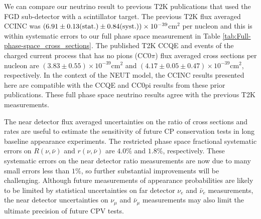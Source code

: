 
We can compare our neutrino result to previous 
T2K publications that used the FGD sub-detector with a scintillator target.
The previous T2K flux averaged
CCINC \citep{t2k-carbon-ccinc} was 
 $(6.91\pm0.13{\rm (stat.)}\pm0.84{\rm (syst.)}) \times 10^{-39}$cm$^2$  per nucleon
and this is within systematic errors to our full phase space measurement
in Table \ref{tab:Full-phase-space_cross_sections}.
The published T2K CCQE \citep{t2k-cceq} and 
events of the charged current process that has no pions (CC0$\pi$) \citep{cc0pi}
flux averaged cross sections per nucleon are
$(3.83\pm0.55) \times 10^{-39}$cm$^2$ 
and
$(4.17\pm0.05\pm0.47) \times 10^{-39}$cm$^2$, respectively. 
In the context of the NEUT model, the CCINC results presented here are 
compatible with the CCQE and CC0pi results from these prior publications.
These full phase space neutrino results agree with the previous T2K measurements.


The near detector flux averaged uncertainties on the ratio of cross sections
and rates are useful to estimate the sensitivity of future CP conservation tests
in long baseline appearance experiments.  
The restricted phase space fractional systematic errors on  $R(\nu,\bar\nu)$  and $r(\nu,\bar\nu)$ 
are $4.0\%$ and $1.8\%$, respectively.  
These systematic errors on the near detector ratio measurements
are now due to many small errors less than $1\%$, so further substantial
improvements will be challenging.  %
Although future measurements of appearance probabilities are likely to be
limited by statistical uncertainties on far detector
$\nu_e$ and $\bar\nu_e$ measurements,
the near detector uncertainties on
$\nu_\mu$ and $\bar\nu_\mu$ measurements 
may also limit the ultimate precision of future CPV tests.%

